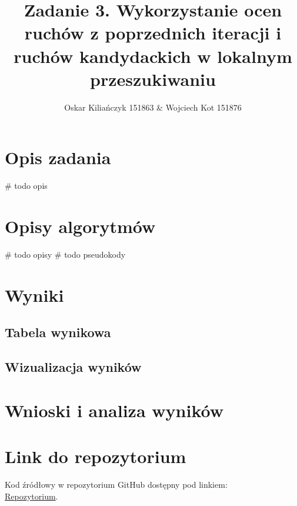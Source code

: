 \documentclass[11pt]{article}
\title{Zadanie 3. Wykorzystanie ocen ruchów z poprzednich iteracji i ruchów
kandydackich w lokalnym przeszukiwaniu}
\author{Oskar Kiliańczyk 151863 \& Wojciech Kot 151876}
\date{}
\begin{document}
\maketitle
\newpage

\section{Opis zadania}\label{sec:opis-zadania}

# todo opis

\section{Opisy algorytmów}\label{sec:opisy-alg}

# todo opisy
# todo pseudokody

\section{Wyniki}\label{sec:wyniki}

\subsection{Tabela wynikowa}\label{subsec:tabela-wynikowa}

\subsection{Wizualizacja wyników}\label{subsec:wizualizacja-wynikow}

\section{Wnioski i analiza wyników}\label{sec:wnioski}


\section{Link do repozytorium}\label{sec:link-do-repo}
Kod źródłowy w repozytorium GitHub dostępny pod linkiem: \\
\href{https://github.com/mojerepoxDfajnylink/}{Repozytorium}.
\end{document}
